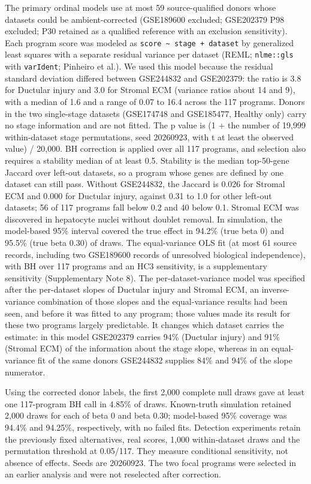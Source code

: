 The primary ordinal models use at most 59 source-qualified donors whose datasets could be ambient-corrected (GSE189600 excluded; GSE202379 P98 excluded; P30 retained as a qualified reference with an exclusion sensitivity). Each program score was modeled as \texttt{score\ \textasciitilde{}\ stage\ +\ dataset} by generalized least squares with a separate residual variance per dataset (REML; \texttt{nlme::gls} with \texttt{varIdent}; Pinheiro et al.). We used this model because the residual standard deviation differed between GSE244832 and GSE202379: the ratio is 3.8 for Ductular injury and 3.0 for Stromal ECM (variance ratios about 14 and 9), with a median of 1.6 and a range of 0.07 to 16.4 across the 117 programs. Donors in the two single-stage datasets (GSE174748 and GSE185477, Healthy only) carry no stage information and are not fitted. The p value is (1 + the number of 19,999 within-dataset stage permutations, seed 20260923, with \textbar t\textbar{} at least the observed value) / 20,000. BH correction is applied over all 117 programs, and selection also requires a stability median of at least 0.5. Stability is the median top-50-gene Jaccard over left-out datasets, so a program whose genes are defined by one dataset can still pass. Without GSE244832, the Jaccard is 0.026 for Stromal ECM and 0.000 for Ductular injury, against 0.31 to 1.0 for other left-out datasets; 56 of 117 programs fall below 0.2 and 40 below 0.1. Stromal ECM was discovered in hepatocyte nuclei without doublet removal. In simulation, the model-based 95\% interval covered the true effect in 94.2\% (true beta 0) and 95.5\% (true beta 0.30) of draws. The equal-variance OLS fit (at most 61 source records, including two GSE189600 records of unresolved biological independence), with BH over 117 programs and an HC3 sensitivity, is a supplementary sensitivity (Supplementary Note 8). The per-dataset-variance model was specified after the per-dataset slopes of Ductular injury and Stromal ECM, an inverse-variance combination of those slopes and the equal-variance results had been seen, and before it was fitted to any program; those values made its result for these two programs largely predictable. It changes which dataset carries the estimate: in this model GSE202379 carries 94\% (Ductular injury) and 91\% (Stromal ECM) of the information about the stage slope, whereas in an equal-variance fit of the same donors GSE244832 supplies 84\% and 94\% of the slope numerator.

Using the corrected donor labels, the first 2,000 complete null draws gave at least one 117-program BH call in 4.85\% of draws. Known-truth simulation retained 2,000 draws for each of beta 0 and beta 0.30; model-based 95\% coverage was 94.4\% and 94.25\%, respectively, with no failed fits. Detection experiments retain the previously fixed alternatives, real scores, 1,000 within-dataset draws and the permutation threshold at 0.05/117. They measure conditional sensitivity, not absence of effects. Seeds are 20260923. The two focal programs were selected in an earlier analysis and were not reselected after correction.

